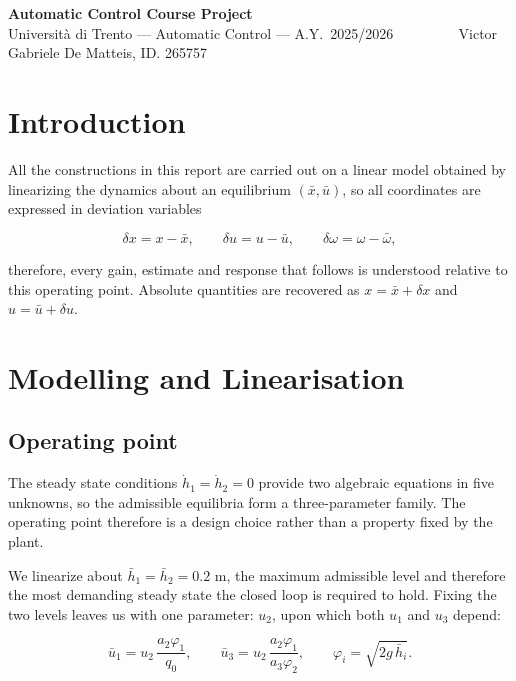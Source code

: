 \documentclass[10pt,a4paper]{scrartcl}
\newcommand{\RuleSection}[1]{%
\section{#1}%
\vspace{0.2em}{\color{accent!35}\hrule height 0.4pt}\vspace{0.3em}%
}
\begin{document}

\begin{center}
{\Large\bfseries\color{accent} Automatic Control Course Project}\\[0.25cm]
{\small Università di Trento --- Automatic Control --- A.Y.\ 2025/2026 $\qquad\qquad$}
{\small Victor Gabriele De Matteis, ID. 265757}\\[0.2cm]
\end{center}




\RuleSection{Introduction}
\label{sec:intro}

All the constructions in this report are carried out on a linear model obtained by linearizing the dynamics about an equilibrium $(\bar x, \bar u)$, so all coordinates are expressed in deviation variables 

$$\delta x = x - \bar x, \qquad \delta u = u - \bar u, \qquad \delta\omega = \omega - \bar\omega,$$

therefore, every gain, estimate and response that follows is understood relative to this operating point. 
Absolute quantities are recovered as  $x = \bar x + \delta x$ and $u = \bar u + \delta u$.

\RuleSection{Modelling and Linearisation}
\label{sec:q1}

\subsection{Operating point}

The steady state conditions $\dot h_1 = \dot h_2=0$ provide two algebraic equations in five unknowns, so the admissible equilibria form a three-parameter family. The operating point therefore is a design choice rather than a property fixed by the plant. 

We linearize about $\bar h_1 = \bar h_2 = 0.2$ m, the maximum admissible level and therefore the most demanding steady state the closed loop is required to hold. 
Fixing the two levels leaves us with one parameter: $u_2$, upon which both $u_1$ and $u_3$ depend:

\begin{equation}
    \bar u_1=u_2\,\frac{a_2\varphi_1}{q_0},\qquad
    \bar u_3=u_2\,\frac{a_2\varphi_1}{a_3\varphi_2},\qquad
    \varphi_i=\sqrt{2g\,\bar h_i}.
    \label{eq:q1_balance}
\end{equation}
\end{document}
